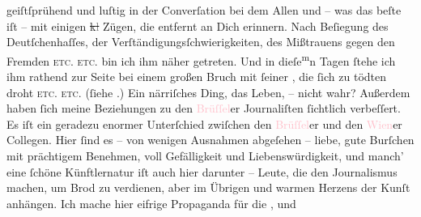 \documentclass[twoside=false,titlepage=false,open=any, parskip=never, fontsize=12pt, headings=small, chapterprefix=false, appendixprefix=false]{scrbook}
\newcommand{\strikeout}[1]{\sout{#1}}
\newcommand{\Theight}{\dimexpr\fontcharht\font`W}
\newcommand{\pbposition}{\depth}
\newcommand{\pb}{\nobreak\hspace{0pt}\raisebox{-0.1em}{\raisebox{\pbposition}{\textnormal{|}}}\nobreak\hspace{0pt}}
\newcommand{\substVorne}{\textnormal{\raisebox{\Theight}{\raisebox{-\height}{\small\upp\normalsize}}}}
\newcommand{\substDazwischen}{}
\newcommand{\substHinten}{\textnormal{\raisebox{\Theight}{\raisebox{-\height}{\small\downp\normalsize}}}}
\begin{document}
               geiſtſprühend und luſtig in der Converſation bei dem Allen und – was das beſte iſt –
               mit einigen \strikeout{k\textcolor{gray}{l}} Zügen, die entfernt an Dich erinnern. Nach Beſiegung des Deutſchenhaſſes, der
               Verſtändigungsſchwierigkeiten, des Mißtrauens gegen den Fremden \textsc{etc. etc.} bin ich ihm näher getreten. Und in dieſe\substVorne{}\textsuperscript{m}\substDazwischen{}n\substHinten{}{ }{\pb}Tagen ſtehe ich ihm rathend zur Seite bei einem
               großen Bruch mit ſeiner \label{K_L02669-2v}\label{K_L02669-2h}, die ſich zu
               tödten droht \textsc{etc. etc.} (ſiehe \label{K_L02669-4v}\label{K_L02669-4h}.) Ein närriſches Ding, das Leben, – nicht
               wahr? Außerdem haben ſich meine Beziehungen zu den \textcolor{pink}{Brüſſel}{}\ledrightnote{\textcolor{pink}{Brüssel}}er Journaliſten ſichtlich verbeſſert. Es iſt ein geradezu enormer
               Unterſchied zwiſchen den \textcolor{pink}{Brüſſel}{}\ledrightnote{\textcolor{pink}{Brüssel}}er und den \textcolor{pink}{Wien}{}\ledrightnote{\textcolor{pink}{Wien}}er Collegen. Hier ſind es – von wenigen
               Ausnahmen abgeſehen – liebe, gute Burſchen mit prächtigem Benehmen, voll Gefälligkeit
               und Liebenswürdigkeit, und manch’ eine ſchöne Künftlernatur iſt auch hier darunter –
               Leute, die den Journalismus machen, um Brod zu verdienen, aber im Übrigen \label{K_L02669-5v}\label{K_L02669-5h}
               und warmen Herzens der Kunſt anhängen. Ich mache hier eifrige Propaganda für die
                  \label{K_L02669-11v}\label{K_L02669-11h}, und
\end{document}
